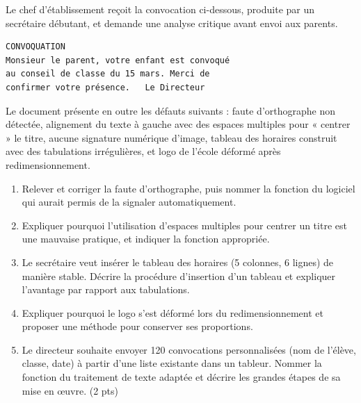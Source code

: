 \documentclass[11pt]{article}
\begin{document}
\begin{exercice}
Le chef d'établissement reçoit la convocation ci-dessous, produite par un secrétaire débutant, et demande une analyse critique avant envoi aux parents.

\begin{verbatim}
CONVOQUATION
Monsieur le parent, votre enfant est convoqué
au conseil de classe du 15 mars. Merci de
confirmer votre présence.   Le Directeur
\end{verbatim}

Le document présente en outre les défauts suivants : faute d'orthographe non détectée, alignement du texte à gauche avec des espaces multiples pour « centrer » le titre, aucune signature numérique d'image, tableau des horaires construit avec des tabulations irrégulières, et logo de l'école déformé après redimensionnement.
\begin{enumerate}
\item Relever et corriger la faute d'orthographe, puis nommer la fonction du logiciel qui aurait permis de la signaler automatiquement.
\item Expliquer pourquoi l'utilisation d'espaces multiples pour centrer un titre est une mauvaise pratique, et indiquer la fonction appropriée.
\item Le secrétaire veut insérer le tableau des horaires (5 colonnes, 6 lignes) de manière stable. Décrire la procédure d'insertion d'un tableau et expliquer l'avantage par rapport aux tabulations.
\item Expliquer pourquoi le logo s'est déformé lors du redimensionnement et proposer une méthode pour conserver ses proportions.
\item Le directeur souhaite envoyer 120 convocations personnalisées (nom de l'élève, classe, date) à partir d'une liste existante dans un tableur. Nommer la fonction du traitement de texte adaptée et décrire les grandes étapes de sa mise en œuvre. (2 pts)
\end{enumerate}
\end{exercice}
\end{document}
